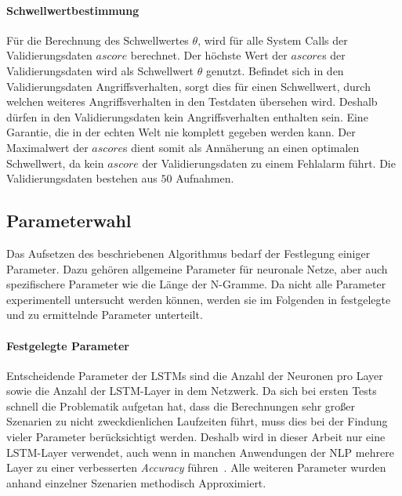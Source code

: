             \paragraph{Schwellwertbestimmung}\label{sec:Schwellung}
                Für die Berechnung des Schwellwertes $\theta$, wird für alle System Calls der Validierungsdaten $ascore$ berechnet.
                Der höchste Wert der $ascore$s der Validierungsdaten wird als Schwellwert $\theta$ genutzt.
                Befindet sich in den Validierungsdaten Angriffsverhalten, sorgt dies für einen Schwellwert, durch welchen weiteres Angriffsverhalten in den Testdaten übersehen wird.
                Deshalb dürfen in den Validierungsdaten kein Angriffsverhalten enthalten sein.
                Eine Garantie, die in der echten Welt nie komplett gegeben werden kann.
                Der Maximalwert der $ascore$s dient somit als Annäherung an einen optimalen Schwellwert, da kein $ascore$ der Validierungsdaten zu einem Fehlalarm führt.
                Die Validierungsdaten bestehen aus $50$ Aufnahmen. 
                

        \subsection{Parameterwahl}\label{sec:parameterwahl}
            Das Aufsetzen des beschriebenen Algorithmus bedarf der Festlegung einiger Parameter.
            Dazu gehören allgemeine Parameter für neuronale Netze, aber auch spezifischere Parameter wie die Länge der N-Gramme.
            Da nicht alle Parameter experimentell untersucht werden können, werden sie im Folgenden in festgelegte und zu ermittelnde Parameter unterteilt.
            \paragraph{Festgelegte Parameter}
                Entscheidende Parameter der \acp{LSTM} sind die Anzahl der Neuronen pro Layer sowie die Anzahl der \ac{LSTM}-Layer in dem Netzwerk.
                Da sich bei ersten Tests schnell die Problematik aufgetan hat, dass die Berechnungen sehr großer Szenarien zu nicht zweckdienlichen Laufzeiten führt, muss dies bei der Findung vieler Parameter berücksichtigt werden.
                Deshalb wird in dieser Arbeit nur eine \ac{LSTM}-Layer verwendet, auch wenn in manchen Anwendungen der \ac{NLP} mehrere Layer zu einer verbesserten \textit{Accuracy} führen~\cite{LSTMHYPERAUFA2020}.
                Alle weiteren Parameter wurden anhand einzelner Szenarien methodisch Approximiert.\par\medskip

